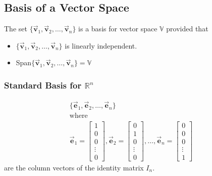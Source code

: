 \documentclass[12pt,landscape,twocolumn]{article}
\let\oldvec\vec
\renewcommand{\vec}[1]{\oldvec{\mathbf{ #1 } } }                    %
\begin{document}
    \subsection{Basis of a Vector Space}
    The set $\{\vec{v}_1, \vec{v}_2, \ldots, \vec{v}_n\}$ is a basis for vector space $\mathbb{V}$ provided that

    \begin{itemize}
        \item $\{\vec{v}_1, \vec{v}_2, \ldots, \vec{v}_n\}$ is linearly independent.
        \item Span$\{\vec{v}_1, \vec{v}_2, \ldots, \vec{v}_n\} = \mathbb{V}$
    \end{itemize}

        \subsubsection{Standard Basis for $\mathbb{R}^n$}
        \begin{equation}\label{eq:basis_for_rn}
        \begin{aligned}
            \{\vec{e}_1, \vec{e}_2, \ldots, \vec{e}_n\}\\
            \text{where}\\
            \vec{e}_1 = \left[ \begin{array}{c}
                1\\
                0\\
                0\\
                \vdots\\
                0
            \end{array}\right],
            \vec{e}_2 = \left[ \begin{array}{c}
                0\\
                1\\
                0\\
                \vdots\\
                0
            \end{array}\right], \ldots,
            \vec{e}_n = \left[ \begin{array}{c}
                0\\
                0\\
                0\\
                \vdots\\
                1
            \end{array}\right]
        \end{aligned}
        \end{equation}
        are the column vectors of the identity matrix $I_n$.
\end{document}
